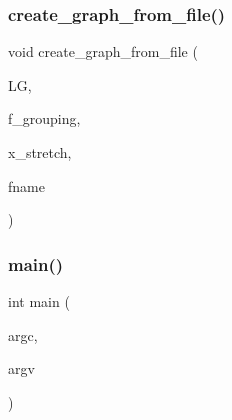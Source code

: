 \subsubsection{\texorpdfstring{create\+\_\+graph\+\_\+from\+\_\+file()}{create\_graph\_from\_file()}}
{\footnotesize\ttfamily void create\+\_\+graph\+\_\+from\+\_\+file (\begin{DoxyParamCaption}\item[{\mbox{\hyperlink{classlayered__graph}{layered\+\_\+graph}} $\ast$\&}]{LG,  }\item[{\mbox{\hyperlink{galois_8h_a09fddde158a3a20bd2dcadb609de11dc}{I\+NT}}}]{f\+\_\+grouping,  }\item[{double}]{x\+\_\+stretch,  }\item[{const \mbox{\hyperlink{galois_8h_ab6cc7b4aeb6ea31aba2b3fbfc83ff5e6}{B\+Y\+TE}} $\ast$}]{fname }\end{DoxyParamCaption})}

\mbox{\label{create__layered__graph__file_8_c_a217dbf8b442f20279ea00b898af96f52}} 
\subsubsection{\texorpdfstring{main()}{main()}}
{\footnotesize\ttfamily int main (\begin{DoxyParamCaption}\item[{int}]{argc,  }\item[{const char $\ast$$\ast$}]{argv }\end{DoxyParamCaption})}

